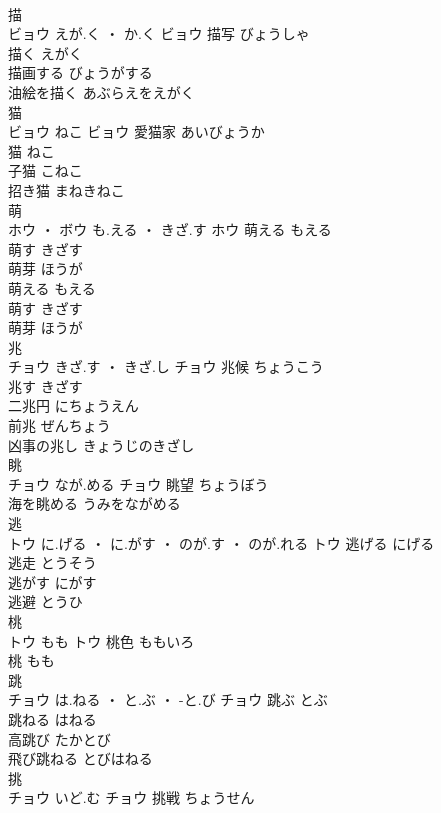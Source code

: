 \documentclass[8pt]{extreport}
\begin{document}
\begin{CJK}{UTF8}{min}
\\	描	
\\	ビョウ	えが.く ・ か.く	ビョウ	描写	びょうしゃ	
\\	描く	えがく	
\\	描画する	びょうがする	
\\	油絵を描く	あぶらえをえがく	
\\	猫	
\\	ビョウ	ねこ	ビョウ	愛猫家	あいびょうか	
\\	猫	ねこ	
\\	子猫	こねこ	
\\	招き猫	まねきねこ	
\\	萌	
\\	ホウ ・ ボウ	も.える ・ きざ.す	ホウ	萌える	もえる	
\\	萌す	きざす	
\\	萌芽	ほうが	
\\	萌える	もえる	
\\	萌す	きざす	
\\	萌芽	ほうが	
\\	兆	
\\	チョウ	きざ.す ・ きざ.し	チョウ	兆候	ちょうこう	
\\	兆す	きざす	
\\	二兆円	にちょうえん	
\\	前兆	ぜんちょう	
\\	凶事の兆し	きょうじのきざし	
\\	眺	
\\	チョウ	なが.める	チョウ	眺望	ちょうぼう	
\\	海を眺める	うみをながめる	
\\	逃	
\\	トウ	に.げる ・ に.がす ・ のが.す ・ のが.れる	トウ	逃げる	にげる	
\\	逃走	とうそう	
\\	逃がす	にがす	
\\	逃避	とうひ	
\\	桃	
\\	トウ	もも	トウ	桃色	ももいろ	
\\	桃	もも	
\\	跳	
\\	チョウ	は.ねる ・ と.ぶ ・ -と.び	チョウ	跳ぶ	とぶ	
\\	跳ねる	はねる	
\\	高跳び	たかとび	
\\	飛び跳ねる	とびはねる	
\\	挑	
\\	チョウ	いど.む	チョウ	挑戦	ちょうせん	

\end{CJK}
\end{document}
